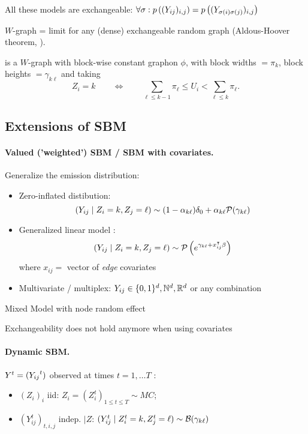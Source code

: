 \ra All these models are exchangeable:
$
\forall \sigma: p\left(({Y_{ij}})_{i, j}\right) = p\left((Y_{\sigma(i)\sigma(j)})_{i, j}\right)
$

\ra $W$-graph = limit for any (dense) exchangeable random graph (Aldous-Hoover theorem, \citep{DiJ08}).

\ra \SBMo is a $W$-graph with block-wise constant graphon $\phi$, with block widths $= \pi_k$, block heights $= \gamma_{k\ell}$ and taking
$$
Z_i = k \qquad \Leftrightarrow \qquad \sum_{\ell \leq k-1} \pi_\ell \leq U_i < \sum_{\ell \leq k} \pi_\ell.
$$


\blank
\subsection{Extensions of SBM}

\jump \paragraph{Valued ('weighted') SBM / SBM with covariates.} Generalize the emission distribution:
\begin{itemize}
\item Zero-inflated distibution:
$$
({Y_{ij}} \mid Z_i=k, Z_j=\ell) \sim (1 - \alpha_{k\ell}) \delta_0 + \alpha_{k\ell} \mathcal{P}(\gamma_{k\ell})
$$
\item Generalized linear model \citep{MRV10}:
$$
({Y_{ij}} \mid Z_i=k, Z_j=\ell) \sim \mathcal{P}\left(e^{\gamma_{k\ell} + x_{ij}^\intercal \beta}\right)
$$
where $x_{ij} =$ vector of {\sl edge} covariates
\item Multivariate / multiplex: ${Y_{ij}} \in \{0, 1\}^d, \mathbb{N}^d, \mathbb{R}^d$ or any combination
\end{itemize}

\ra Mixed Model with node random effect

\ra Exchangeability does not hold anymore when using covariates


\jump \paragraph{Dynamic SBM.} $Y^t = ({Y_{ij}}^t)$ observed at times $t = 1, \dots T$ \citep{MaM17}:
\begin{itemize}
\item $(Z_i)_i$ iid: 
$Z_i = (Z_i^t)_{1 \leq t \leq T} \sim MC$;
\item $(Y^t_{ij})_{t, i, j}$ indep. $\mid Z$: 
$(Y^t_{ij} \mid Z^t_i=k, Z^t_j=\ell) \sim \mathcal{B}(\gamma_{k\ell})$
\end{itemize}
\citep[see also][]{JLB14}

